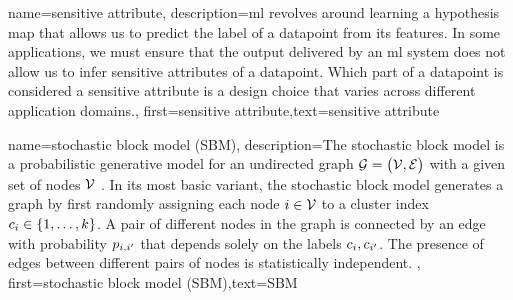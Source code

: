 {name={sensitive attribute},
	description={\gls{ml} revolves around learning a \gls{hypothesis} map that allows 
		us to predict the \gls{label} of a \gls{datapoint} from its \gls{feature}s. In some 
		applications, we must ensure that the output delivered by an \gls{ml} system does 
		not allow us to infer sensitive attributes of a \gls{datapoint}. Which part 
		of a \gls{datapoint} is considered a sensitive attribute is a design 
		choice that varies across different application domains.},
	first={sensitive attribute},text={sensitive attribute} 
}


{name={stochastic block model (SBM)},
	description={The stochastic block \gls{model} is a 
		probabilistic generative \gls{model} for an undirected \gls{graph} $\mathcal{G} = \big( \mathcal{V}, \mathcal{E} \big)$ 
		with a given set of nodes $\mathcal{V}$ \cite{AbbeSBM2018}. In its most basic variant, 
		the stochastic block \gls{model} generates a \gls{graph} by first randomly assigning each node $i \in \mathcal{V}$ to 
		a \gls{cluster} index $c_{i} \in \{1,\ldots,k\}$. A pair of different nodes in the 
		\gls{graph} is connected by an edge with \gls{probability} $p_{i,i'}$ that depends 
		solely on the \gls{label}s $c_{i}, c_{i'}$. 
		The presence of edges between different pairs of 
		nodes is statistically independent. },
	first={stochastic block model (SBM)},text={SBM} 
}

\newcommand{\gaussiancenter}{3}

